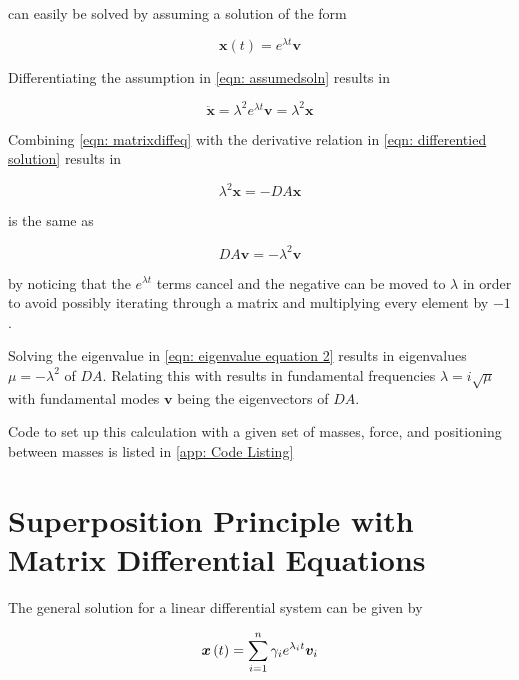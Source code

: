 \documentclass[10pt,a4paper]{article}
\renewcommand{\vec}[1]{\boldsymbol{#1}}
\begin{document}
\begin{multicols*}{2}
 can easily be solved by assuming a solution of the form

\begin{equation}
	\vec{x} (t) = e^{\lambda t} \vec{v}
	\label{eqn: assumedsoln}
\end{equation}

Differentiating the assumption in \cref{eqn: assumedsoln} results in

\begin{equation}
	\ddot{\vec{x}} = \lambda^2 e^{\lambda t} \vec{v} = \lambda^2 \vec{x}
	\label{eqn: differentied solution}
\end{equation}

Combining \cref{eqn: matrixdiffeq} with the derivative relation in \cref{eqn: differentied solution} results in

\begin{equation}
	\lambda^2 \vec{x} = -DA \vec{x}
	\label{eqn: eigenvalue equation 1}
\end{equation}

 is the same as

\begin{equation}
	DA \vec{v} = - \lambda^2 \vec{v}
	\label{eqn: eigenvalue equation 2}
\end{equation}

by noticing that the $e^{\lambda t}$ terms cancel and the negative can be moved to $\lambda$ in order to avoid possibly iterating through a matrix and multiplying every element by $-1$.

Solving the eigenvalue in \cref{eqn: eigenvalue equation 2} results in eigenvalues $\mu = -\lambda^2$ of $DA$. Relating this with  results in fundamental frequencies $\lambda = i \sqrt{\mu}$ with fundamental modes $\vec{v}$ being the eigenvectors of $DA$.

Code to set up this calculation with a given set of masses, force, and positioning between masses is listed in \cref{app: Code Listing}

\section*{Superposition Principle with Matrix Differential Equations}

The general solution for a linear differential system can be given by

\begin{equation}
	\vec{x}\paren{t} = \sum\limits_{i=1}^n \gamma_i e^{\lambda_i t} \vec{v}_i
	\label{eqn: Superposition}
\end{equation}


\end{multicols*}
\end{document}
